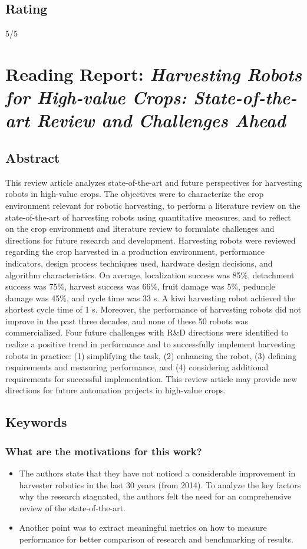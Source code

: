     \subsection*{Rating}
    5/5
    
    \newpage
    \section{Reading Report: \emph{Harvesting Robots for High-value Crops: State-of-the-art Review and Challenges Ahead}}
    \cite{Bac2014}
    
    \subsection*{Abstract}
    This review article analyzes state-of-the-art and future perspectives for harvesting robots in high-value crops.
    The objectives were to characterize the crop environment relevant for robotic harvesting, to perform a literature
    review on the state-of-the-art of harvesting robots using quantitative measures, and to reflect on the crop environment and literature review to formulate challenges and directions for future research and development.
    Harvesting robots were reviewed regarding the crop harvested in a production environment, performance indicators, design process techniques used, hardware design decisions, and algorithm characteristics. On average,
    localization success was 85\%, detachment success was 75\%, harvest success was 66\%, fruit damage was 5\%,
    peduncle damage was 45\%, and cycle time was 33 s. A kiwi harvesting robot achieved the shortest cycle time
    of 1 s. Moreover, the performance of harvesting robots did not improve in the past three decades, and none
    of these 50 robots was commercialized. Four future challenges with R\&D directions were identified to realize
    a positive trend in performance and to successfully implement harvesting robots in practice: (1) simplifying
    the task, (2) enhancing the robot, (3) defining requirements and measuring performance, and (4) considering
    additional requirements for successful implementation. This review article may provide new directions for
    future automation projects in high-value crops.
    \subsection*{Keywords}
    
     
    \subsubsection*{What are the motivations for this work?}
    \begin{itemize}
        \item The authors state that they have not noticed a considerable improvement in harvester robotics in the last 30 years (from 2014). To analyze the key factors why the research stagnated, the authors felt the need for an comprehensive review of the state-of-the-art.
        \item Another point was to extract meaningful metrics on how to measure performance for better comparison of research and benchmarking of results.
    \end{itemize}
